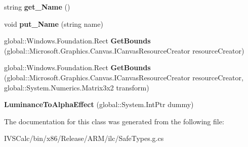 \begin{DoxyCompactItemize}
\item 
\mbox{\label{class_microsoft_1_1_graphics_1_1_canvas_1_1_effects_1_1_luminance_to_alpha_effect_a1981987289ab13d1d8693349c236cccc}} 
string {\bfseries get\+\_\+\+Name} ()
\item 
\mbox{\label{class_microsoft_1_1_graphics_1_1_canvas_1_1_effects_1_1_luminance_to_alpha_effect_a9d0857e6dbb76f71d216d4cb162defb7}} 
void {\bfseries put\+\_\+\+Name} (string name)
\item 
\mbox{\label{class_microsoft_1_1_graphics_1_1_canvas_1_1_effects_1_1_luminance_to_alpha_effect_a3e7eeaa07b2936a2ce93f317a126962e}} 
global\+::\+Windows.\+Foundation.\+Rect {\bfseries Get\+Bounds} (global\+::\+Microsoft.\+Graphics.\+Canvas.\+I\+Canvas\+Resource\+Creator resource\+Creator)
\item 
\mbox{\label{class_microsoft_1_1_graphics_1_1_canvas_1_1_effects_1_1_luminance_to_alpha_effect_ad5cb5e950c30b07d3ea03eaa4c460a4f}} 
global\+::\+Windows.\+Foundation.\+Rect {\bfseries Get\+Bounds} (global\+::\+Microsoft.\+Graphics.\+Canvas.\+I\+Canvas\+Resource\+Creator resource\+Creator, global\+::\+System.\+Numerics.\+Matrix3x2 transform)
\item 
\mbox{\label{class_microsoft_1_1_graphics_1_1_canvas_1_1_effects_1_1_luminance_to_alpha_effect_a9d29e122dde9d7d9a316dd3ede498668}} 
{\bfseries Luminance\+To\+Alpha\+Effect} (global\+::\+System.\+Int\+Ptr dummy)
\end{DoxyCompactItemize}


The documentation for this class was generated from the following file\+:\begin{DoxyCompactItemize}
\item 
I\+V\+S\+Calc/bin/x86/\+Release/\+A\+R\+M/ilc/Safe\+Types.\+g.\+cs\end{DoxyCompactItemize}
